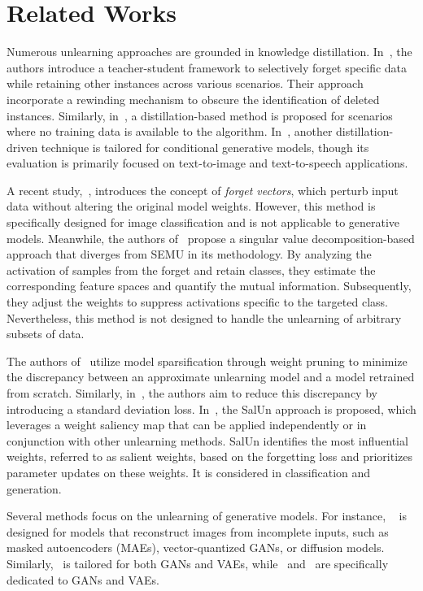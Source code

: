 \section{Related Works}
\label{sec:rw}

Numerous unlearning approaches are grounded in knowledge distillation. In~\cite{kurmanji2023scrub}, the authors introduce a teacher-student framework to selectively forget specific data while retaining other instances across various scenarios. Their approach incorporate a rewinding mechanism to obscure the identification of deleted instances. Similarly, in~\cite{chundawat2023zeroshot}, a distillation-based method is proposed for scenarios where no training data is available to the algorithm. In~\cite{Kong2024satml}, another distillation-driven technique is tailored for conditional generative models, though its evaluation is primarily focused on text-to-image and text-to-speech applications.

A recent study,~\cite{sun2025forgetvectorsplayuniversal}, introduces the concept of \emph{forget vectors}, which perturb input data without altering the original model weights. However, this method is specifically designed for image classification and is not applicable to generative models. Meanwhile, the authors of~\cite{kodge2024deep} propose a 
singular value decomposition-based approach that diverges from SEMU in its methodology.
By analyzing the activation of samples from the forget and retain classes, they estimate the corresponding feature spaces and quantify the mutual information. Subsequently, they adjust the weights to suppress activations specific to the targeted class. Nevertheless, this method is not designed to handle the unlearning of arbitrary subsets of data.

The authors of~\cite{jia2023model} utilize model sparsification through weight pruning to minimize the discrepancy between an approximate unlearning model and a model retrained from scratch. Similarly, in~\cite{thudi2022unrolling}, the authors aim to reduce this discrepancy by introducing a standard deviation loss.
In~\cite{fan2024salun}, the SalUn approach is proposed, which leverages a weight saliency map that can be applied independently or in conjunction with other unlearning methods. SalUn identifies the most influential weights, referred to as salient weights, based on  the forgetting loss  and prioritizes parameter updates on these weights.
It is considered in classification and generation.

Several methods focus on the unlearning of generative models. For instance, ~\cite{li2024machineunlearning} is designed for models that reconstruct images from incomplete inputs, such as masked autoencoders (MAEs), vector-quantized GANs, or diffusion models. Similarly,~\cite{moon2024feature} is tailored for both GANs and VAEs, while~\cite{sun2023generativeadversarialnetworksunlearning} and~\cite{bae2023gradientsurgeryoneshotunlearning} are specifically dedicated to GANs and VAEs. 

